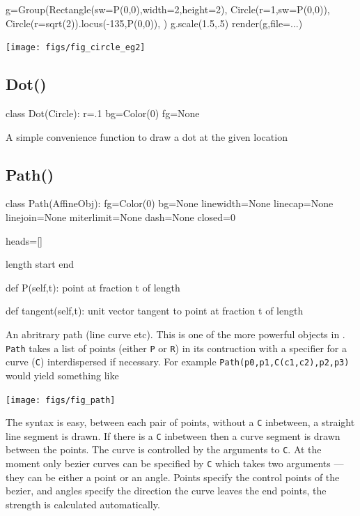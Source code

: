 \documentclass[a4paper]{book}
\begin{document}
\begin{example}
\begin{python}
g=Group(Rectangle(sw=P(0,0),width=2,height=2),
        Circle(r=1,sw=P(0,0)),
        Circle(r=sqrt(2)).locus(-135,P(0,0)),
        )
g.scale(1.5,.5)
render(g,file=...)
\end{python}
\begin{center}
  \texttt{[image: figs/fig\_circle\_eg2]}
\end{center}
\end{example}

\subsection{Dot()}
\label{sec:dot}
\begin{python}
class Dot(Circle):
    r=.1
    bg=Color(0)
    fg=None
\end{python}

A simple convenience function to draw a dot at the given location

\subsection{Path()}
\label{sec:path}
\begin{python}
class Path(AffineObj):
    fg=Color(0)
    bg=None
    linewidth=None
    linecap=None
    linejoin=None
    miterlimit=None
    dash=None
    closed=0

	heads=[]

    length
    start
    end

    def P(self,t):
       point at fraction t of length
	   
    def tangent(self,t):
       unit vector tangent to point at fraction t of length

\end{python}

An abritrary path (line curve etc). This is one of the more powerful
objects in \pyscript. \Verb|Path| takes a list of points (either
\Verb|P| or \Verb|R|) in its contruction with a specifier for a
curve (\Verb|C|) interdispersed if necessary. For example
\Verb|Path(p0,p1,C(c1,c2),p2,p3)| would yield something like
\begin{center}
  \texttt{[image: figs/fig\_path]}
\end{center}
The syntax is easy, between each pair of points, without a
 \Verb|C| inbetween, a straight line segment is drawn. If there
is a  \Verb|C| inbetween then a curve segment is drawn between 
the points. The curve is controlled by the arguments to \Verb|C|.
At the moment only bezier curves can be specified by \Verb|C|
which takes two arguments --- they can be either a point or an angle. 
Points specify the control points of the bezier, and angles specify
the direction the curve leaves the end points, the strength is 
calculated automatically.
\end{document}
